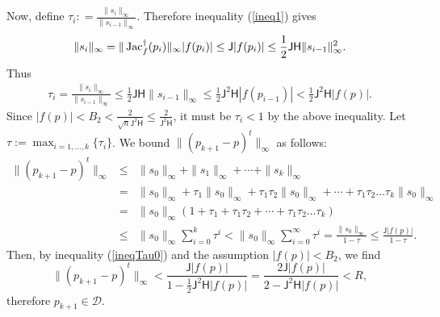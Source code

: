 \documentclass[10pt]{article}
\def\Jac{\mathop{\rm Jac}\nolimits}
\begin{document}
Now,  
define $\tau_i : =\frac{\|s_i\|_\infty}{\|s_{i-1}\|_\infty}$.
Therefore inequality (\ref{ineq1}) gives 
$$
\|s_i\|_\infty = \|\Jac_f^\dagger(p_i)\|_\infty |f(p_i)|
\le {\mathsf J} |f(p_i)| \le \frac{1}{2} \mathsf J \mathsf H \|s_{i-1}\|_\infty^2.
$$
Thus
\begin{eqnarray}\label{ineqTau0}
\tau_i = \frac{\|s_i\|_\infty}{\|s_{i-1}\|_\infty} \le \frac{1}{2} \mathsf J \mathsf H \|s_{i-1}\|_\infty
\le \frac{1}{2} \mathsf J^2 \mathsf H |f(p_{i-1})|  < \frac{1}{2} \mathsf J^2 {\mathsf H} |f(p)|. 
\end{eqnarray}
Since $|f(p)| < B_2 < \frac{2}{\sqrt{n} \mathsf J^2 {\mathsf H}} \le \frac{2}{\mathsf J^2 {\mathsf H}}$,
 it must be $\tau_i<1$ by the above inequality. 
Let $\tau:=\max_{i=1, \ldots, k} \{\tau_i\}$. We bound $\|(p_{k+1}-p)^t\|_\infty$ as follows:
\begin{eqnarray*}
 \|(p_{k+1} -p)^t\|_\infty &\le& \|s_0\|_\infty + \|s_1\|_\infty + \cdots +\|s_k\|_\infty \\
 &=& \|s_0\|_\infty + \tau_1 \|s_0\|_\infty + \tau_1\tau_2 \|s_0\|_\infty +  \cdots +\tau_1 \tau_2 \ldots \tau_k \|s_0\|_\infty\\
&=& \|s_0\|_\infty (1 + \tau_1+\tau_1\tau_2 +\cdots + \tau_1\tau_2 \dots \tau_k)\\
&\leq& \|s_0\|_\infty \sum_{i=0}^k \tau^i <\|s_0\|_\infty  \sum_{i=0}^\infty \tau^i =\frac{\|s_0\|_\infty}{1- \tau}\leq   \frac{\mathsf J |f(p)|}{1- \tau}.
\end{eqnarray*}
Then, by  inequality (\ref{ineqTau0}) and  the assumption $|f(p)| < B_2$, we find
$$
\|(p_{k+1} -p)^t\|_\infty < \frac{\mathsf J |f(p)|}{1- \frac{1}{2} \mathsf J^2 {\mathsf H} |f(p)|} =
\frac{2 \mathsf J |f(p)|}{2- \mathsf J^2 {\mathsf H} |f(p)|} < R,
$$
therefore $p_{k+1} \in \mathcal D$. 
\end{document}
